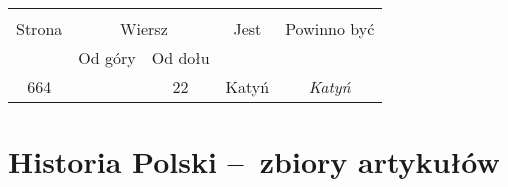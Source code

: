\documentclass[a4paper,11pt]{article}
\begin{document}
\begin{center}
  \begin{tabular}{|c|c|c|c|c|}
    \hline
    & \multicolumn{2}{c|}{} & & \\
    Strona & \multicolumn{2}{c|}{Wiersz} & Jest
                              & Powinno być \\ \cline{2-3}
    & Od góry & Od dołu & & \\
    \hline
    664 & & 22 & Katyń & \emph{Katyń} \\
    \hline
  \end{tabular}
\end{center}





\section{Historia Polski --~zbiory artykułów}

\vspace{\spaceTwo}


\end{document}
